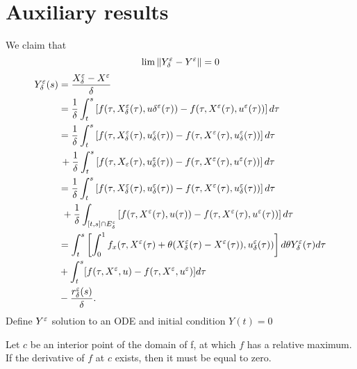 \chapter{Auxiliary results}

    We claim that
    $$
        \lim \left\lVert Y_\delta^\varepsilon - Y^{\varepsilon}\right\rVert = 0
    $$
    \begin{align*}
        Y_{\delta}^{\veps}(s) &= \dfrac{X_{\delta}^{\veps} - X^{\veps}}{\delta} \\
        &= \dfrac{1}{\delta}\int_{t}^{s} %
            \left[f(\tau, X_{\delta}^{\veps}(\tau),u{\delta}^{\veps}(\tau)) - %
            f(\tau, X^{\veps}(\tau), u^{\veps}(\tau))\right]d\tau \\
        &= \dfrac{1}{\delta}\int_{t}^{s} %
            \left[f(\tau, X_{\delta}^{\veps}(\tau),u_{\delta}^{\veps}(\tau)) - %
            f(\tau, X^{\veps}(\tau), u^{\veps}_{\delta}(\tau))\right]d\tau \\
            &\,+ %
            \dfrac{1}{\delta}\int_{t}^{s} %
            \left[f(\tau, X_{\veps}(\tau), u_{\delta}^{\veps}(\tau)) - %
            f(\tau, X^{\veps}(\tau), u^{\veps}(\tau))\right]d\tau \\
        &= \dfrac{1}{\delta}\int_{t}^{s} %
            \left[f(\tau, X_{\delta}^{\veps}(\tau),u_{\delta}^{\veps}(\tau)) - %
            f(\tau, X^{\veps}(\tau), u^{\veps}_{\delta}(\tau))\right]d\tau \\
            &\, \,+ %
            \dfrac{1}{\delta}\int_{[t,s]\cap E^{\veps}_{\delta}} %
            \left[f(\tau, X^{\veps}(\tau), u(\tau)) - %
            f(\tau, X^{\veps}(\tau), u^{\veps}(\tau))\right]d\tau \\
        &= \int_{t}^{s}\left[\int_{0}^{1} f_{x}(\tau, X^{\veps}(\tau) + \theta(X^{\veps}_{\delta}(\tau) - X^{\veps}(\tau)), u^{\veps}_{\delta}(\tau))\right]d\theta
        Y^{\veps}_{\delta}(\tau)d\tau \\
        &+ \int_{t}^{s}[f(\tau, X^{\veps}, u) - f(\tau, X^{\veps}, u^{\veps})]d\tau \\
        &- \dfrac{r^{\veps}_{\delta}(s)}{\delta}.
    \end{align*}
    Define $Y^{\varepsilon}$ solution to an ODE and initial condition $Y(t) = 0$

\begin{theorem}
    Let $c$ be an interior point of the domain of f, at which $f$ has a relative 
    maximum. If the derivative of $f$ at $c$ exists, then it must be equal to zero.
\end{theorem}


